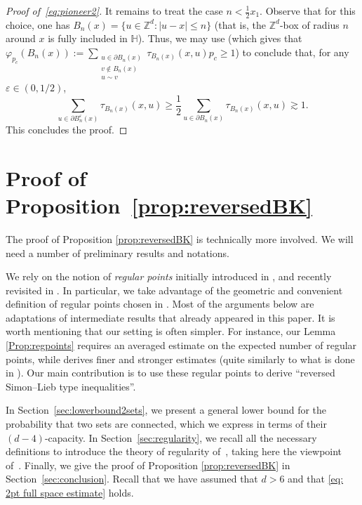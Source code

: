 \documentclass[11pt,a4paper]{article}
\numberwithin{equation}{section}
\theoremstyle{plain}
\theoremstyle{definition}
\begin{document}
\begin{proof}[Proof of~\eqref{eq:pioneer2}]
It remains to treat the case $n<\tfrac{1}{2}x_1$. Observe that for this choice, one has $B_n(x)=\{u\in \mathbb Z^d : |u-x|\leq n\}$ (that is, the $\mathbb Z^d$-box of radius $n$ around $x$ is fully included in $\mathbb H$). Thus, we may use \cite{DuminilTassionNewProofSharpness2016} (which gives that $\varphi_{p_c}(B_n(x)):=\sum_{\substack{u\in \partial B_n(x)\\v\notin B_n(x)\\u\sim v}}\tau_{B_n(x)}(x,u)p_c\geq 1$) to conclude that, for any $\varepsilon\in (0,1/2)$,
\begin{equation}
	\sum_{u\in \partial B_n^\varepsilon(x)}\tau_{B_n(x)}(x,u)\geq \frac{1}{2}\sum_{u\in \partial B_n(x)}\tau_{B_n(x)}(x,u)\gtrsim 1.
\end{equation} 
This concludes the proof. 
\end{proof}



\section{Proof of Proposition~\ref{prop:reversedBK}}
The proof of Proposition \ref{prop:reversedBK} is technically more involved. We will need a number of preliminary results and notations.


We rely on the notion of \emph{regular points} initially introduced in \cite{KozmaNachmias}, and recently revisited in \cite{Asselah2025capacity}. In particular, we take advantage of the geometric and convenient definition of regular points chosen in \cite{Asselah2025capacity}. Most of the arguments below are adaptations of intermediate results that already appeared in this paper. It is worth mentioning that our setting is often simpler. For instance, our Lemma \ref{Prop:regpoints} requires an averaged estimate on the expected number of regular points, while \cite[Section~6]{Asselah2025capacity} derives finer and stronger estimates (quite similarly to what is done in \cite{KozmaNachmias}). Our main contribution is to use these regular points to derive ``reversed Simon--Lieb type inequalities''.


 In Section~\ref{sec:lowerbound2sets}, we present a general lower bound for the probability that two sets are connected, which we express in terms of their $(d-4)$-capacity. In Section~\ref{sec:regularity}, we recall all the necessary definitions to introduce the theory of regularity of~\cite{KozmaNachmias}, taking here the viewpoint of~\cite{Asselah2025capacity}. Finally, we give the proof of Proposition \ref{prop:reversedBK} in Section~\ref{sec:conclusion}. Recall that we have assumed that $d>6$ and that \eqref{eq: 2pt full space estimate} holds.
\end{document}
